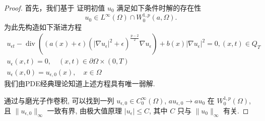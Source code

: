 \documentclass[twoside,longtitle]{LZUthesis}
\theoremstyle{definition}
\numberwithin{equation}{chapter}
\newcommand*\abs[1]{\lvert#1\rvert}
\newcommand*\norm[1]{\lVert#1\rVert}
\DeclareMathOperator{\Div}{div}
\begin{document}
\begin{proof}
	首先，我们基于 {\cite{Zhan2019Uniquenessa}} 证明初值 $u_0$ 满足如下条件时解的存在性
	\begin{equation}\label{initial_data_condition_tmp}
		u_0 \in L^{\infty}(\Omega) \cap W_0^{1, p}(a, \Omega).
	\end{equation}
	为此先构造如下渐进方程
\begin{gather}
	u_{\epsilon t}-\Div\left((a(x)+\epsilon)
	\left(\left|\nabla u_{\epsilon}\right|^{2}+\epsilon\right)^{\frac{p-2}{2}} \nabla u_{\epsilon}\right)
	+b(x)\left|\nabla u_{\epsilon}\right|^{2} = 0,(x, t) \in Q_{T} \label{eq:approximated_maineq} \\
	u_{\epsilon}(x, t)  = 0, \quad(x, t) \in \partial \Omega \times(0, T)\\
	u_{\epsilon}(x, 0)  = u_{\epsilon, 0}(x), \quad x \in \Omega
\end{gather}
	我们由PDE经典理论知道上述方程具有唯一弱解.

	通过与磨光子作卷积,
	可以找到一列 $u_{\epsilon,0} \in C_0^\infty(\Omega) $, $au_{\epsilon,0} \to au_0 $ 在 $W_0^{1,p}(\Omega) $,
	且 $\norm{u_{\epsilon, 0}}_{\infty}$ 一致有界, 
	由极大值原理 $\abs{u_{\epsilon}} \leq C$,
	其中 $C$ 只与 $\norm{u_0}_{\infty} $ 有关.


\end{proof}
\end{document}
